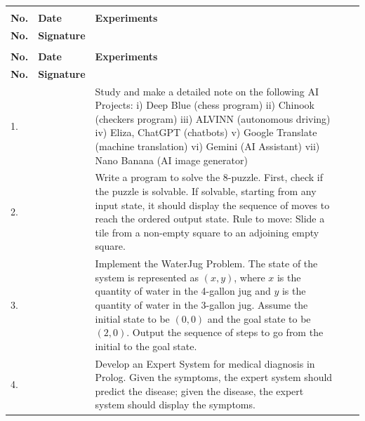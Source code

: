 \documentclass[11pt, a4paper]{article}
\begin{document}
\begin{longtable}{
  |>{\centering\arraybackslash}p{0.7cm}
  |>{\centering\arraybackslash}p{1.7cm}
  |>{\arraybackslash}p{9.3cm}
  |>{\centering\arraybackslash}p{1.3cm}
  |>{\centering\arraybackslash}p{2.2cm}|
}

\hline
\rowcolor{tablegray}
\makecell{\textbf{Sr.}\\\textbf{No.}} & \textbf{Date} & \textbf{Experiments} & \makecell{\textbf{Page}\\\textbf{No.}} & \textbf{Signature} \\
\hline
\endfirsthead

\hline
\rowcolor{tablegray}
\makecell{\textbf{Sr.}\\\textbf{No.}} & \textbf{Date} & \textbf{Experiments} & \makecell{\textbf{Page}\\\textbf{No.}} & \textbf{Signature} \\
\hline
\endhead

1. & &
Study and make a detailed note on the following AI Projects:\newline
\quad i)   Deep Blue (chess program)\newline
\quad ii)  Chinook (checkers program)\newline
\quad iii) ALVINN (autonomous driving)\newline
\quad iv)  Eliza, ChatGPT (chatbots)\newline
\quad v)   Google Translate (machine translation)\newline
\quad vi)  Gemini (AI Assistant)\newline
\quad vii) Nano Banana (AI image generator)
& & \\
\hline

2. & &
Write a program to solve the 8-puzzle. First, check if the puzzle is solvable. If solvable, starting from any input state, it should display the sequence of moves to reach the ordered output state. Rule to move: Slide a tile from a non-empty square to an adjoining empty square.
& & \\
\hline

3. & &
Implement the WaterJug Problem. The state of the system is represented as $(x,y)$, where $x$ is the quantity of water in the 4-gallon jug and $y$ is the quantity of water in the 3-gallon jug. Assume the initial state to be $(0,0)$ and the goal state to be $(2,0)$. Output the sequence of steps to go from the initial to the goal state.
& & \\
\hline

4. & &
Develop an Expert System for medical diagnosis in Prolog. Given the symptoms, the expert system should predict the disease; given the disease, the expert system should display the symptoms.
& & \\
\hline


\end{longtable}
\end{document}

